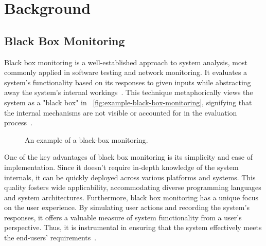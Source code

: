 \usetikzlibrary{positioning,fit,calc}

\chapter{Background}\label{chapter:background}

\section{Black Box Monitoring}

Black box monitoring is a well-established approach to system analysis, most commonly applied in software testing and network monitoring. It evaluates a system's functionality based on its responses to given inputs while abstracting away the system's internal workings~\parencite{jorgensenSoftwareTestingCraftsman2021}. This technique metaphorically views the system as a "black box" in ~\autoref{fig:example-black-box-monitoring}, signifying that the internal mechanisms are not visible or accounted for in the evaluation process~\parencite{myersArtSoftwareTesting2004}.

\begin{figure}[htpb]
    \centering
    \caption[Example black-box monitoring]{An example of a black-box monitoring.}\label{fig:example-black-box-monitoring}
\end{figure}

One of the key advantages of black box monitoring is its simplicity and ease of implementation. Since it doesn't require in-depth knowledge of the system internals, it can be quickly deployed across various platforms and systems. This quality fosters wide applicability, accommodating diverse programming languages and system architectures. Furthermore, black box monitoring has a unique focus on the user experience. By simulating user actions and recording the system's responses, it offers a valuable measure of system functionality from a user's perspective. Thus, it is instrumental in ensuring that the system effectively meets the end-users' requirements~\parencite{nidhraBlackBoxWhite2012}. 

